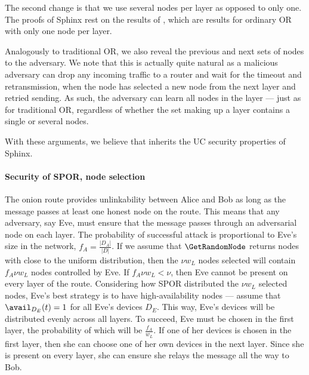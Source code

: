 The second change is that we use several nodes per layer as opposed to only 
one.
The proofs of Sphinx rest on the results of \textcite{CLOnionRouting}, which 
are results for ordinary \ac{OR} with only one node per layer.

Analogously to traditional \ac{OR},  we also reveal the previous and next sets 
of nodes to the adversary. 
We note that this is actually quite natural as a malicious adversary can drop 
any incoming traffic to a router and wait for the timeout and
retransmission, \ie when the 
node has selected a new node from the next layer and retried sending.
As such, the adversary can learn all nodes in the layer --- just as for 
traditional \ac{OR}, regardless of whether the set making up a layer contains a
single or several nodes.

With these arguments, we believe that \Sphinxes inherits the \ac{UC} security 
properties of Sphinx. %

\paragraph*{Security of \acs*{SPOR}, node selection}

The onion route provides unlinkability between Alice and Bob as long as the 
message passes at least one honest node on the route.
This means that any adversary, say Eve,  must ensure that the message passes 
through an adversarial node on each layer.
The probability of successful attack is proportional to Eve's size in the 
network, \ie \(f_A = \frac{|D_A|}{|D|}\).
If we assume that \(\GetRandomNode\) returns nodes with close to the uniform 
distribution, then the \(\nu w_L\) nodes selected will contain \(f_A \nu w_L\) 
nodes controlled by Eve.
If \(f_A \nu w_L < \nu\), then Eve cannot be present on every layer of the 
route.
Considering how \ac{SPOR} distributed the \(\nu w_L\) selected nodes, Eve's 
best strategy is to have high-availability nodes --- assume that 
\(\avail_{D_E}(t) = 1\) for all Eve's devices \(D_E\).
This way, Eve's devices will be distributed evenly across all layers.
To succeed, Eve must be chosen in the first layer, the probability of which 
will be \(\frac{f_A}{w_L}\).
If one of her devices is chosen in the first layer, then she can choose one of 
her own devices in the next layer.
Since she is present on every layer, she can ensure she relays the message all 
the way to Bob. 

